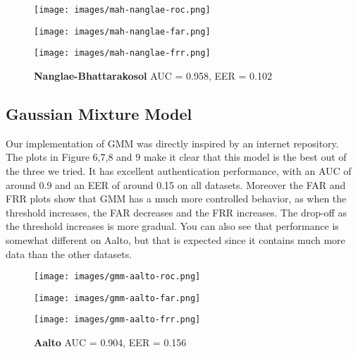 \begin{figure}[H]
    \centering
    \texttt{[image: images/mah-nanglae-roc.png]}
\end{figure}
\begin{figure}[H]
    \centering
    \begin{minipage}{0.49\textwidth} %
        \centering
        \texttt{[image: images/mah-nanglae-far.png]}
    \end{minipage}
    \hfill
    \begin{minipage}{0.49\textwidth} %
        \centering
        \texttt{[image: images/mah-nanglae-frr.png]}
    \end{minipage}
    \caption{\textbf{Nanglae-Bhattarakosol } AUC = 0.958, EER = 0.102}
\end{figure}
\FloatBarrier

\subsection{Gaussian Mixture Model}
Our implementation of GMM was directly inspired by an internet repository\cite{ref:gmm-code}.\\

The plots in Figure 6,7,8 and 9 make it clear that this model is the best out of the three we tried. It has excellent authentication performance, with an AUC of around 0.9 and an EER of around 0.15 on all datasets. Moreover the FAR and FRR plots show that GMM has a much more controlled behavior, as  when the threshold increases, the FAR decreases and the FRR increases. The drop-off as the threshold increases is more gradual. You can also see that performance is somewhat different on Aalto, but that is expected since it contains much more data than the other datasets.
\newpage

\begin{figure}[H]
    \centering
    \texttt{[image: images/gmm-aalto-roc.png]}
\end{figure}
\begin{figure}[H]
    \centering
    \begin{minipage}{0.49\textwidth} %
        \centering
        \texttt{[image: images/gmm-aalto-far.png]}
    \end{minipage}
    \hfill
    \begin{minipage}{0.49\textwidth} %
        \centering
        \texttt{[image: images/gmm-aalto-frr.png]}
    \end{minipage}
    \caption{\textbf{Aalto } AUC = 0.904, EER = 0.156}
\end{figure}

